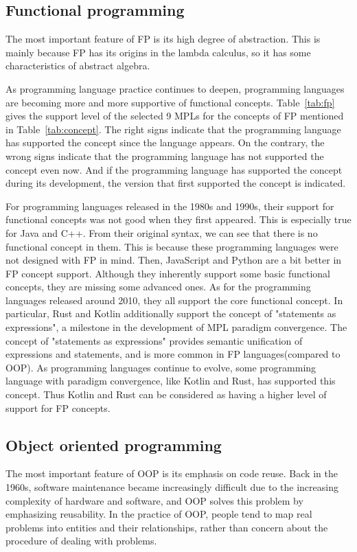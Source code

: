 \subsection{Functional programming}

The most important feature of FP is its high degree of abstraction.
This is mainly because FP has its origins in the lambda calculus,
so it has some characteristics of abstract algebra.


As programming language practice continues to deepen,
programming languages are becoming more and more supportive
of functional concepts.
Table~\ref{tab:fp} gives the support level of the selected 9 MPLs for the concepts
of FP mentioned in Table~\ref{tab:concept}.
The right signs indicate that the programming language has
supported the concept since the language appears.
On the contrary, the wrong signs indicate that the programming language has
not supported the concept even now.
And if the programming language has supported the concept during its development,
the version that first supported the concept is indicated.


For programming languages released in the 1980s and 1990s,
their support for functional concepts was not good when they first appeared.
This is especially true for Java and C++.
From their original syntax, we can see that there is no functional concept in them.
This is because these programming languages were not designed with FP in mind.
Then, JavaScript and Python are a bit better in FP concept support.
Although they inherently support some basic functional concepts, they are missing some advanced ones.
As for the programming languages released around 2010, they all support the core functional concept.
In particular, Rust and Kotlin additionally support the concept of "statements as expressions",
a milestone in the development of MPL paradigm convergence.
The concept of "statements as expressions" provides semantic unification of expressions and statements,
and is more common in FP languages(compared to OOP).
As programming languages continue to evolve, some programming language with paradigm convergence,
like Kotlin and Rust, has supported this concept.
Thus Kotlin and Rust can be considered as having a higher level of support for FP concepts.

\subsection{Object oriented programming}
The most important feature of OOP is its emphasis on code reuse.
Back in the 1960s, software maintenance became increasingly difficult due to the increasing
complexity of hardware and software, and OOP solves this problem by emphasizing reusability.
In the practice of OOP, people tend to map real problems into entities and their relationships,
rather than concern about the procedure of dealing with problems.


